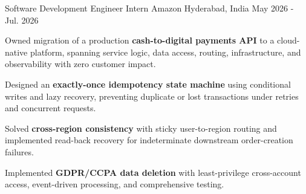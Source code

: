 

\begin{cventries}

  \cventry
    {Software Development Engineer Intern} %
    {Amazon} %
    {Hyderabad, India} %
    {May 2026 - Jul. 2026} %
    {
      \begin{cvitems} %
        \item {Owned migration of a production \textbf{cash-to-digital payments API} to a cloud-native platform, spanning service logic, data access, routing, infrastructure, and observability with zero customer impact.}
        \item {Designed an \textbf{exactly-once idempotency state machine} using conditional writes and lazy recovery, preventing duplicate or lost transactions under retries and concurrent requests.}
        \item {Solved \textbf{cross-region consistency} with sticky user-to-region routing and implemented read-back recovery for indeterminate downstream order-creation failures.}
        \item {Implemented \textbf{GDPR/CCPA data deletion} with least-privilege cross-account access, event-driven processing, and comprehensive testing.}
      \end{cvitems}
    }
\end{cventries}